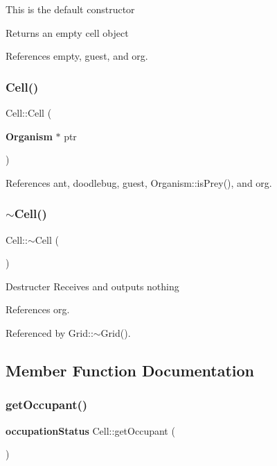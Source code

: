 This is the default constructor \begin{DoxyReturn}{Returns}
an empty cell object 
\end{DoxyReturn}


References empty, guest, and org.

\mbox{\label{classCell_a91d4d12d7c64617c7a266e0c8c56a4cd}} 
\subsubsection{Cell()\hspace{0.1cm}{\footnotesize\ttfamily [2/2]}}
{\footnotesize\ttfamily Cell\+::\+Cell (\begin{DoxyParamCaption}\item[{\textbf{ Organism} $\ast$}]{ptr }\end{DoxyParamCaption})}



References ant, doodlebug, guest, Organism\+::is\+Prey(), and org.

\mbox{\label{classCell_a9fa559f7a28e2b4336c6879ca09304d8}} 
\subsubsection{$\sim$\+Cell()}
{\footnotesize\ttfamily Cell\+::$\sim$\+Cell (\begin{DoxyParamCaption}{ }\end{DoxyParamCaption})\hspace{0.3cm}{\ttfamily [virtual]}}

Destructer Receives and outputs nothing 

References org.



Referenced by Grid\+::$\sim$\+Grid().



\subsection{Member Function Documentation}
\mbox{\label{classCell_a7dcb8bc75a2e2591b3fd52b5f7c28ab1}} 
\subsubsection{get\+Occupant()}
{\footnotesize\ttfamily \textbf{ occupation\+Status} Cell\+::get\+Occupant (\begin{DoxyParamCaption}{ }\end{DoxyParamCaption})}




